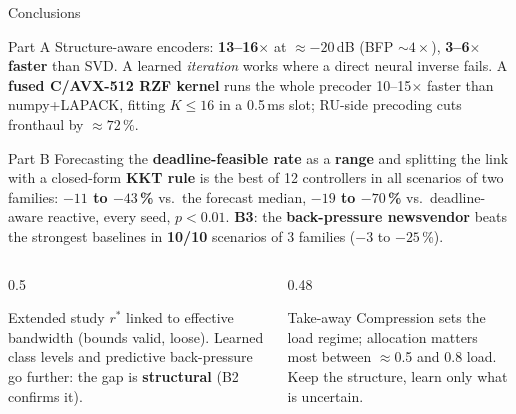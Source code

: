 \documentclass[aspectratio=169,11pt,xcolor=table]{beamer}
\newcommand{\rstar}{r^{\ast}}
\begin{document}
\begin{frame}{Conclusions}
  \footnotesize
  \begin{block}{Part A}
    Structure-aware encoders: \textbf{13--16$\times$} at $\approx -20$\,dB (BFP $\sim 4\times$), \textbf{3--6$\times$ faster} than SVD. A learned \emph{iteration} works where a direct neural inverse fails. A \textbf{fused C/AVX-512 RZF kernel} runs the whole precoder 10--15$\times$ faster than numpy+LAPACK, fitting $K \le 16$ in a 0.5\,ms slot; RU-side precoding cuts fronthaul by $\approx 72\,\%$.
  \end{block}
  \begin{block}{Part B}
    Forecasting the \textbf{deadline-feasible rate} as a \textbf{range} and splitting the link with a closed-form \textbf{KKT rule} is the best of 12 controllers in all scenarios of two families: \textbf{$-11$ to $-43$\,\%} vs.\ the forecast median, \textbf{$-19$ to $-70$\,\%} vs.\ deadline-aware reactive, every seed, $p < 0.01$. \textbf{B3}: the \textbf{back-pressure newsvendor} beats the strongest baselines in \textbf{10/10} scenarios of 3 families ($-3$ to $-25$\,\%).
  \end{block}
  \begin{columns}[T]
    \begin{column}{0.5\textwidth}
  \begin{block}{Extended study}
    $\rstar$ linked to effective bandwidth (bounds valid, loose). Learned class levels and predictive back-pressure go further: the gap is \textbf{structural} (B2 confirms it).
  \end{block}
    \end{column}
    \begin{column}{0.48\textwidth}
  \begin{exampleblock}{Take-away}
    Compression sets the load regime; allocation matters most between $\approx$0.5 and 0.8 load. Keep the structure, learn only what is uncertain.
  \end{exampleblock}
    \end{column}
  \end{columns}
\end{frame}
\end{document}
